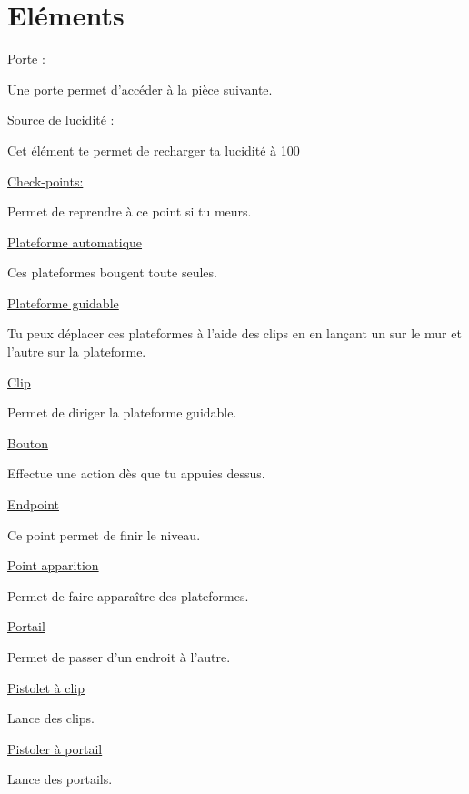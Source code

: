 \documentclass[12pt]{article}
\begin{document}
\newpage


\section{Eléments}

\begin{flushleft}

\underline{Porte :}

Une porte permet d’accéder à la pièce suivante.


\quad


\underline{Source de lucidité :}

Cet élément te permet de recharger ta lucidité à 100%

\quad

\underline{Check-points:}

Permet de reprendre à ce point si tu meurs.

\quad

\underline{Plateforme automatique}

Ces plateformes bougent toute seules.

\quad

\underline{Plateforme guidable}

Tu peux déplacer ces plateformes à l’aide des clips en en lançant un sur le mur et l’autre sur la plateforme.

\quad

\underline{Clip}

Permet de diriger la plateforme guidable.

\quad

\underline{Bouton}

Effectue une action dès que tu appuies dessus.

\quad

\underline{Endpoint}

Ce point permet de finir le niveau.

\quad

\newpage

\underline{Point apparition}

Permet de faire apparaître des plateformes.

\quad

\underline{Portail}

Permet de passer d’un endroit à l’autre.

\quad

\underline{Pistolet à clip}

Lance des clips.

\quad

\underline{Pistoler à portail}

Lance des portails.

\end{flushleft}
\end{document}
